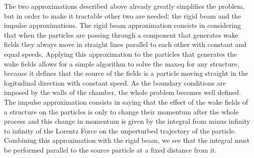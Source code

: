     The two approximations described above already greatly simplifies the problem, but in order to make it tractable other two are needed: the rigid beam and the impulse approximations. The rigid beam approximation consists in considering that when the particles are passing through a component that generates wake fields they always move in straight lines parallel to each other with constant and equal speeds. Applying this approximation to the particles that generates the wake fields allows for a simple algorithm to solve the \gls{maxeq} for any structure, because it defines that the source of the fields is a particle moving straight in the logitudinal direction with constant speed. As the boundary conditions are imposed by the walls of the chamber, the whole problem becomes well defined. The impulse approximation consists in saying that the effect of the wake fields of a structure on the particles is only to change their momentum after the whole process and this change in momentum is given by the integral from minus infinity to infinity of the Lorentz Force on the unperturbed trajectory of the particle. Combining this approximation with the rigid beam, we see that the integral must be performed parallel to the source particle at a fixed distance from it.


